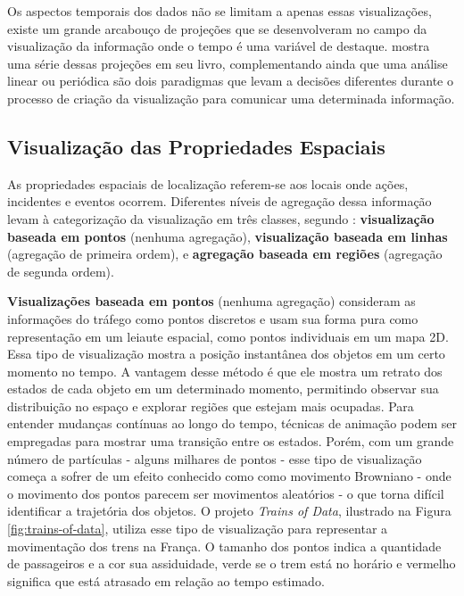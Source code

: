 Os aspectos temporais dos dados não se limitam a apenas essas visualizações, existe
um grande arcabouço de projeções que se desenvolveram no campo da visualização da
informação onde o tempo é uma variável de destaque. \citet{Cairo2016} mostra uma série
dessas projeções em seu livro, complementando ainda que uma análise linear ou periódica
são dois paradigmas que levam a decisões diferentes durante o processo de criação da visualização
para comunicar uma determinada informação.


\subsection{Visualização das Propriedades Espaciais}

As propriedades espaciais de localização referem-se aos locais onde ações, incidentes e
eventos ocorrem. Diferentes níveis de agregação dessa informação levam à categorização
da visualização em três classes, segundo \citet{Chen2015}: \textbf{visualização baseada em pontos}
(nenhuma agregação), \textbf{visualização baseada em linhas} (agregação de primeira ordem), e
\textbf{agregação baseada em regiões} (agregação de segunda ordem).

\textbf{Visualizações baseada em pontos} (nenhuma agregação)
consideram as informações do tráfego como pontos discretos e usam sua forma
pura como representação em um leiaute espacial, como pontos individuais em um mapa 2D.
Essa tipo de visualização mostra a posição instantânea dos objetos em um certo momento
no tempo. A vantagem desse método é que ele mostra um retrato dos estados de cada objeto em um
determinado momento, permitindo observar sua distribuição no espaço e explorar regiões que estejam
mais ocupadas. Para entender mudanças contínuas ao longo do tempo, técnicas de animação podem
ser empregadas para mostrar uma transição entre os estados. Porém, com um grande número de partículas
- alguns milhares de pontos - esse tipo de visualização começa a sofrer
de um efeito conhecido como como movimento Browniano - onde o movimento dos pontos parecem ser movimentos
aleatórios - o que torna difícil identificar a trajetória dos objetos. O projeto \emph{Trains of Data},
ilustrado na Figura \ref{fig:trains-of-data}, utiliza esse tipo de visualização para
representar a movimentação dos trens na França. O tamanho dos pontos indica a quantidade de passageiros e a cor
sua assiduidade, verde se o trem está no horário e vermelho significa que está atrasado
em relação ao tempo estimado.

